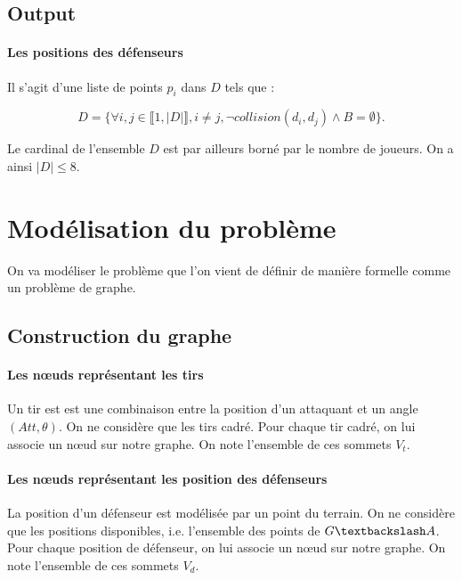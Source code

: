 \documentclass{article}
\begin{document}
\subsection{Output}

\paragraph{Les positions des défenseurs} Il s'agit d'une liste de points $p_i$ dans $D$ tels que :

\begin{equation*}
D = \{ \forall i, j \in \llbracket 1, |D| \rrbracket, i \ne j, \neg collision(d_i, d_j) \wedge B = \emptyset \}.
\end{equation*}

Le cardinal de l'ensemble $D$ est par ailleurs borné par le nombre de joueurs. On a ainsi $|D| \leqslant 8$.



\section{Modélisation du problème}

On va modéliser le problème que l'on vient de définir de manière formelle comme un problème de graphe.

\subsection{Construction du graphe}

\paragraph{Les n\oe uds représentant les tirs}
Un tir est est une combinaison entre la position d'un attaquant et un angle $(Att, \theta)$. On ne considère que les tirs cadré. Pour chaque tir cadré, on lui associe un n\oe ud sur notre graphe. On note l'ensemble de ces sommets $V_t$.

\paragraph{Les n\oe uds représentant les position des défenseurs}
La position d'un défenseur est modélisée par un point du terrain. On ne considère que les positions disponibles, i.e. l'ensemble des points de $G\textbackslash A$. Pour chaque position de défenseur, on lui associe un n\oe ud sur notre graphe. On note l'ensemble de ces sommets $V_d$.
\end{document}
